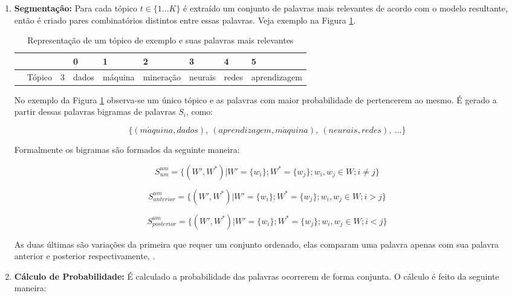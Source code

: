 \documentclass[12pt,a4paper]{article}
\begin{document}
\begin{enumerate}
\item \textbf{Segmentação:} Para cada tópico $t \in \{1 ... K\}$ é extraído um conjunto de palavras mais relevantes de acordo com o modelo resultante,
 então é criado pares combinatórios distintos entre essas palavras. Veja exemplo na Figura \ref{fig-exe}.

\begin{table}[h]
  \centering
  \begin{tabular}{l l l l l l l l l}
  & & &0 &1 &2 &3 &4 &5 \\
  \hline
  &Tópico &3 &dados &máquina &mineração &neurais &redes &aprendizagem \\
  \hline
  \end{tabular}
  \caption{Representação de um tópico de exemplo e suas palavras mais relevantes}
  \label{fig-exe}
\end{table}

No exemplo da Figura \ref{fig-exe} observa-se um único tópico e as palavras com maior probabilidade de pertencerem ao mesmo. É gerado a partir dessas palavras bigramas de palavras $S_i$, como:

\[\{(m\acute{a}quina, dados),\ (aprendizagem, m\acute{a}quina),\ (neurais, redes),\ ...\}\]

Formalmente os bigramas são formados da seguinte maneira:

\begin{equation}
S_{um}^{um} = \{(W',W^*)|W' = \{w_i\};
W^* =  \{w_j\};w_i,w_j \in W; i \neq j\}
\end{equation}

\begin{equation}
S_{anterior}^{um} = \{(W',W^*)|W' = \{w_i\};
W^* =  \{w_j\};w_i,w_j \in W; i > j\}
\end{equation}

\begin{equation}
S_{posterior}^{um} = \{(W',W^*)|W' = \{w_i\};
W^* =  \{w_j\};w_i,w_j \in W; i < j\}
\end{equation}

As duas últimas são variações da primeira que requer um conjunto ordenado, elas comparam uma palavra apenas com sua palavra anterior e posterior respectivamente, \cite{roder2015exploring}.

\item \textbf{Cálculo de Probabilidade:} É calculado a probabilidade das palavras ocorrerem de forma conjunta. O cálculo é feito da seguinte maneira:


\end{enumerate}
\end{document}
